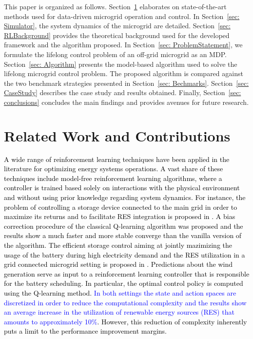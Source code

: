 \documentclass{article}
\begin{document}
	This paper is organized as follows. Section~\ref{sec: RelatedWork} elaborates on state-of-the-art methods used for data-driven microgrid operation and control.  In Section~\ref{sec: Simulator}, the system dynamics of the microgrid are detailed. Section~\ref{sec: RLBackground} provides the theoretical background used for the developed framework and the algorithm proposed. In Section~\ref{sec: ProblemStatement}, we formulate the lifelong control problem of an off-grid microgrid as an MDP. Section~\ref{sec: Algorithm} presents the model-based algorithm used to solve the lifelong microgrid control problem. The proposed algorithm is compared against the two benchmark strategies presented in Section~\ref{sec: Bechmarks}. Section~\ref{sec: CaseStudy} describes the case study and results obtained. Finally, Section~\ref{sec: conclusions} concludes the main findings and provides avenues for future research.

\section{Related Work and Contributions} \label{sec: RelatedWork}

	\textcolor{black}{A wide range of reinforcement learning techniques have been applied in the literature for optimizing energy systems operations. A vast share of these techniques include model-free reinforcement learning algorithms, where a controller is trained based solely on interactions with the physical environment and without using prior knowledge regarding system dynamics. For instance, the problem of controlling a storage device connected to the main grid in order to maximize its returns and to facilitate RES integration is proposed in \cite{lee2012intelligent}. A bias correction procedure of the classical Q-learning algorithm \cite{watkins1992q} was proposed and the results show a much faster and more stable converge than the vanilla version of the algorithm.
	The efficient storage control aiming at jointly mazimizing the usage of the battery during high electricity demand and the RES utilization in a grid connected microgrid setting is proposed in \cite{Kuznetsova2013}. Predictions about the wind generation serve as input to a reinforcement learning controller that is responsible for the battery scheduling. In particular, the optimal control policy is computed using the Q-learning method. \textcolor{blue}{In both settings the state and action spaces are discretized in order to reduce the computational complexity and the results show an average increase in the utilization of renewable energy sources (RES) that amounts to approximately 10\%}. However, this reduction of complexity inherently puts a limit to the performance improvement margins.} 
	
\end{document}
